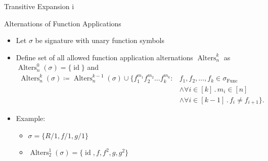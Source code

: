 \documentclass[aspectratio=169]{beamer}
\begin{document}
	\begin{frame}{Transitive Expansion i}
		\begin{block}{Alternations of Function Applications}
			\begin{itemize}
				\item Let $\sigma$ be signature with unary function symbols
				\item Define set of all allowed function application alternations $\operatorname{Alters}^k_n$ as $\operatorname{Alters}^0_n(\sigma)=\{\operatorname{id}\}$ and 
				\begin{align*}
					\operatorname{Alters}^k_{n}(\sigma)\coloneqq \operatorname{Alters}^{k-1}_{n}(\sigma)\cup\{f_1^{m_1}f_2^{m_2}\dots f_k^{m_k} : & f_1,f_2,\dots, f_k\in \sigma_{\operatorname{Func}} \\ 
					& \land \forall i\in[k]\operatorname{.} m_i\in[n] \\ 
					& \land \forall i\in[k-1] \operatorname{.} f_{i} \neq f_{i+1}\}.
				\end{align*}
			\end{itemize}
		\end{block}
		\begin{itemize}
			\item Example: 
			\begin{itemize}
				\item $\sigma=\{R/1,f/1,g/1\}$
				\item $\operatorname{Alters}^1_2(\sigma)=\{\operatorname{id}, f,f^2,g,g^2\}$
			\end{itemize}
		\end{itemize}
	\end{frame}
	
\end{document}
